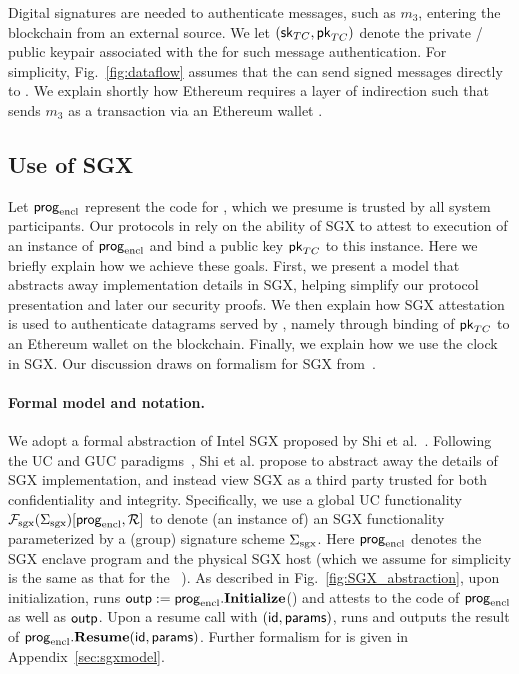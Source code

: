 Digital signatures are needed to authenticate messages, such as $m_3$, entering the blockchain from an external source. We let $({\sf sk}_{TC}, {\sf pk}_{TC})$ denote the private / public keypair associated with the \encname for such message authentication. For simplicity, Fig.~\ref{fig:dataflow} assumes that the \encname can send signed messages directly to \tcont. We explain shortly how Ethereum requires a layer of indirection such that \tc sends $m_3$ as a transaction via an Ethereum wallet \tcadd.


\subsection{Use of SGX}
\label{sec:useofsgx}

Let ${\sf prog}_{\textrm{encl}}$ represent the code for \encname, which we presume is trusted by all system participants. Our protocols in \tc rely on the ability of SGX to attest to execution of an instance of ${\sf prog}_{\textrm{encl}}$ and bind a public key ${\sf pk}_{TC}$ to this instance. Here we briefly explain how we achieve these goals. First, we present a model that abstracts away implementation details in SGX, helping simplify our protocol presentation and later our security proofs. We then explain how SGX attestation is used to authenticate datagrams served by \tcont, namely through binding of ${\sf pk}_{TC}$ to an Ethereum wallet on the blockchain. Finally, we explain how we use the clock in SGX. Our discussion draws on formalism for SGX from~\cite{sgxsok}.


\paragraph{\bf Formal model and notation.} 
We adopt a formal abstraction
of Intel SGX proposed by Shi et al.~\cite{sgxsok}. %
Following the UC and GUC paradigms~\cite{uc,guc,juc}, Shi et al.
propose to 
abstract away the details of SGX implementation,
and instead view SGX
as a third party trusted
for both confidentiality and integrity.
Specifically, we use a global UC  
functionality $\mathcal{F}_{\textrm{sgx}}({\Sigma_{\textrm{sgx}}})[{\sf prog}_{\textrm{encl}}, \mathcal{R}]$
to denote (an instance of) an SGX functionality parameterized
by a (group) signature scheme ${\Sigma_{\textrm{sgx}}}$.
Here ${\sf prog}_{\textrm{encl}}$ denotes the SGX enclave program and \relay the physical
SGX host (which we assume for simplicity is the same as that for the \tc~\medname).
As described in Fig.~\ref{fig:SGX_abstraction}, upon initialization, \fsgx runs ${\sf outp} := {\sf prog}_{\textrm{encl}}.{\bf Initialize}$()
and attests to the code of ${\sf prog}_{\textrm{encl}}$ as well as ${\sf outp}$.
Upon a resume call with ${(\sf id, params)}$, \fsgx runs and outputs the result of
${\sf prog}_{\textrm{encl}}.{\bf Resume}({\sf id, params})$.
Further formalism for \fsgx is given in Appendix~\ref{sec:sgxmodel}.

